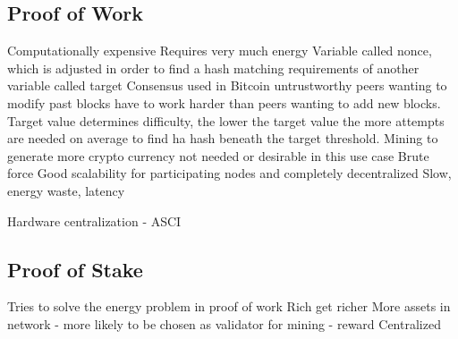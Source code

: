 \subsection{Proof of Work}
Computationally expensive
Requires very much energy
Variable called nonce, which is adjusted in order to find a hash matching requirements of another variable called target
Consensus used in Bitcoin
untrustworthy peers wanting to modify past blocks have to work harder than peers wanting to add new blocks. 
Target value determines difficulty, the lower the target value the more attempts are needed on average to find ha hash beneath the target threshold. 
Mining to generate more crypto currency not needed or desirable in this use case 
Brute force
Good scalability for participating nodes and completely decentralized 
Slow, energy waste, latency 

Hardware centralization - ASCI



\subsection{Proof of Stake}
Tries to solve the energy problem in proof of work
Rich get richer
More assets in network - more likely to be chosen as validator for mining - reward
Centralized


